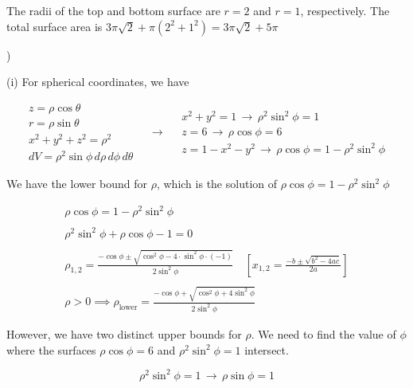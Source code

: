 \documentclass{article}
\begin{document}
\hfill

\noindent The radii of the top and bottom surface are $r=2$ and $r=1$, respectively. The total surface area is $3\pi\sqrt2 + \pi\left(2^2+1^2\right)=\boxed{3\pi\sqrt2+5\pi}$

\hfill

)

\hfill

\noindent (i) For spherical coordinates, we have

\[
\begin{array}{c}
z=\rho\cos\theta\\
r=\rho\sin\theta\\
x^2+y^2+z^2=\rho^2\\
dV=\rho^2\sin\phi\,d\rho\,d\phi\,d\theta
\end{array}\quad\rightarrow\quad
\begin{array}{c}
x^2+y^2=1\,\rightarrow\,\rho^2\sin^2\phi = 1\\
z=6\,\rightarrow\,\rho\cos\phi=6\\
z=1-x^2-y^2\,\rightarrow\,\rho\cos\phi=1-\rho^2\sin^2\phi
\end{array}
\]

\hfill

\noindent We have the lower bound for $\rho$, which is the solution of $\rho\cos\phi=1-\rho^2\sin^2\phi$

\[
\begin{array}{c}
\rho\cos\phi=1-\rho^2\sin^2\phi\\\\
\rho^2\sin^2\phi+\rho\cos\phi-1=0\\\\
\displaystyle \rho_{1,2} = \frac{-\cos\phi \pm\sqrt{\cos^2\phi-4\cdot\sin^2\phi\cdot(-1)}}{2\sin^2\phi}\quad\left[x_{1,2}=\frac{-b\pm\sqrt{b^2-4ac}}{2a}\right]\\\\
\displaystyle \rho>0\implies\rho_{\text{lower}}=\frac{-\cos\phi +\sqrt{\cos^2\phi+4\sin^2\phi}}{2\sin^2\phi}
\end{array}
\]

\hfill

\noindent However, we have two distinct upper bounds for $\rho$. We need to find the value of $\phi$ where the surfaces $\rho\cos\phi = 6$ and $\rho^2\sin^2\phi=1$ intersect.

\begin{equation*}
\rho^2\sin^2\phi=1 \,\rightarrow\,\rho\sin\phi = 1
\end{equation*}
\end{document}

